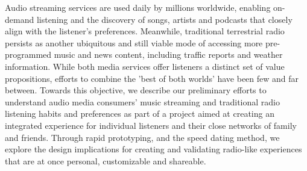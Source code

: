 \noindent Audio streaming services are used daily by millions worldwide, enabling on-demand listening and the discovery of songs, artists and podcasts that closely align with the listener's preferences. Meanwhile, traditional terrestrial radio persists as another ubiquitous and still viable mode of accessing more pre-programmed music and news content, including traffic reports and weather information. While both media services offer listeners a distinct set of value propositions, efforts to combine the 'best of both worlds' have been few and far between. Towards this objective, we describe our preliminary efforts to understand audio media consumers' music streaming and traditional radio listening habits and preferences as part of a project aimed at creating an integrated experience for individual listeners and their close networks of family and friends. Through rapid prototyping, and the speed dating method, we explore the design implications for creating and validating radio-like experiences that are at once personal, customizable and shareable.